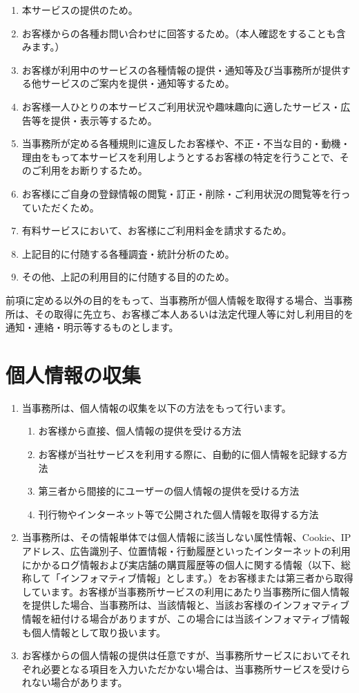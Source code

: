 \documentclass[a4j,titlepage]{ltjsarticle}
\begin{document}
\begin{enumerate}
	\item 本サービスの提供のため。
	\item お客様からの各種お問い合わせに回答するため。（本人確認をすることも含みます。）
	\item お客様が利用中のサービスの各種情報の提供・通知等及び当事務所が提供する他サービスのご案内を提供・通知等するため。
	\item お客様一人ひとりの本サービスご利用状況や趣味趣向に適したサービス・広告等を提供・表示等するため。
	\item 当事務所が定める各種規則に違反したお客様や、不正・不当な目的・動機・理由をもって本サービスを利用しようとするお客様の特定を行うことで、そのご利用をお断りするため。
	\item お客様にご自身の登録情報の閲覧・訂正・削除・ご利用状況の閲覧等を行っていただくため。
	\item 有料サービスにおいて、お客様にご利用料金を請求するため。
	\item 上記目的に付随する各種調査・統計分析のため。
	\item その他、上記の利用目的に付随する目的のため。
\end{enumerate}


前項に定める以外の目的をもって、当事務所が個人情報を取得する場合、当事務所は、その取得に先立ち、お客様ご本人あるいは法定代理人等に対し利用目的を通知・連絡・明示等するものとします。

\section{個人情報の収集}
\begin{enumerate}
	\item 当事務所は、個人情報の収集を以下の方法をもって行います。
	      \begin{enumerate}[(1)]
		      \item お客様から直接、個人情報の提供を受ける方法
		      \item お客様が当社サービスを利用する際に、自動的に個人情報を記録する方法
		      \item 第三者から間接的にユーザーの個人情報の提供を受ける方法
		      \item 刊行物やインターネット等で公開された個人情報を取得する方法
	      \end{enumerate}
	\item 当事務所は、その情報単体では個人情報に該当しない属性情報、Cookie、IP アドレス、広告識別子、位置情報・行動履歴といったインターネットの利用にかかるログ情報および実店舗の購買履歴等の個人に関する情報（以下、総称して「インフォマティブ情報」とします。）をお客様または第三者から取得しています。お客様が当事務所サービスの利用にあたり当事務所に個人情報を提供した場合、当事務所は、当該情報と、当該お客様のインフォマティブ情報を紐付ける場合がありますが、この場合には当該インフォマティブ情報も個人情報として取り扱います。
	\item お客様からの個人情報の提供は任意ですが、当事務所サービスにおいてそれぞれ必要となる項目を入力いただかない場合は、当事務所サービスを受けられない場合があります。
\end{enumerate}
\end{document}
